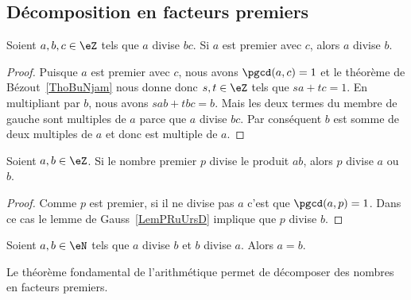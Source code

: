 
\subsection{Décomposition en facteurs premiers}

\begin{lemma}    \label{LemPRuUrsD}
	Soient \( a,b,c\in \eZ\) tels que \( a\) divise \( bc\). Si \( a\) est premier avec \( c\), alors \( a\) divise \( b\).
\end{lemma}

\begin{proof}
	Puisque \( a\) est premier avec \( c\), nous avons \( \pgcd(a,c)=1\) et le théorème de Bézout~\ref{ThoBuNjam} nous donne donc \( s,t\in \eZ\) tels que \( sa+tc=1\). En multipliant par \( b\), nous avons \( sab+tbc=b\). Mais les deux termes du membre de gauche sont multiples de \( a\) parce que \( a\) divise \( bc\). Par conséquent \( b\) est somme de deux multiples de \( a\) et donc est multiple de \( a\).
\end{proof}

\begin{lemma}       \label{LemAXINooOeuMJZ}
	Soient \( a,b\in \eZ\). Si le nombre premier \( p\) divise le produit \( ab\), alors \( p\) divise \( a\) ou \( b\).
\end{lemma}

\begin{proof}
	Comme \( p\) est premier, si il ne divise pas \( a\) c'est que \( \pgcd(a,p)=1\). Dans ce cas le lemme de Gauss~\ref{LemPRuUrsD} implique que \( p\) divise \( b\).
\end{proof}

\begin{lemma}		\label{LEMooSRFMooHgEMwj}
	Soient \( a,b\in \eN\) tels que \( a\) divise \( b\) et \( b\) divise \( a\). Alors \( a=b\).
\end{lemma}

Le théorème fondamental de l'arithmétique permet de décomposer des nombres en facteurs premiers.

